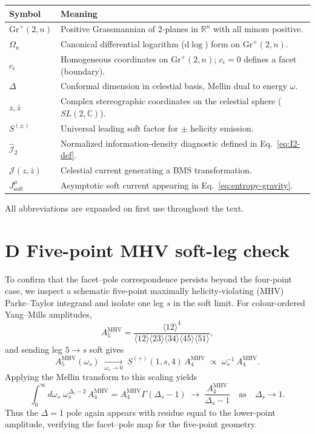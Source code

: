 \documentclass[11pt]{article}
\begin{document}
\begin{center}
\begin{tabular}{@{}ll@{}}
\toprule
Symbol & Meaning \\ \midrule
$\mathrm{Gr}^+(2,n)$ & Positive Grassmannian of 2-planes in $\mathbb{R}^n$ with all minors positive. \\
$\Omega_n$ & Canonical differential logarithm ($\mathrm{d}\!\log$) form on $\mathrm{Gr}^+(2,n)$. \\
$c_i$ & Homogeneous coordinates on $\mathrm{Gr}^+(2,n)$; $c_i=0$ defines a facet (boundary). \\
$\Delta$ & Conformal dimension in celestial basis, Mellin dual to energy $\omega$. \\
$z,\bar z$ & Complex stereographic coordinates on the celestial sphere ($SL(2,\mathbb{C})$). \\
$S^{(\pm)}$ & Universal leading soft factor for $\pm$ helicity emission. \\
$\widehat{\mathcal I}_2$ & Normalized information-density diagnostic defined in Eq.~\eqref{eq:I2-def}. \\
$\mathcal{J}(z,\bar z)$ & Celestial current generating a BMS transformation. \\
$J^\mu_{\text{soft}}$ & Asymptotic soft current appearing in Eq.~\eqref{eq:entropy-gravity}. \\ \bottomrule
\end{tabular}
\end{center}

All abbreviations are expanded on first use throughout the text.

\section*{D  Five-point MHV soft-leg check}

To confirm that the facet--pole correspondence persists beyond the four-point case,
we inspect a schematic five-point maximally helicity-violating (MHV) Parke--Taylor
integrand and isolate one leg $s$ in the soft limit.
For colour-ordered Yang--Mills amplitudes,
\[
A_5^{\mathrm{MHV}} = 
\frac{\langle12\rangle^4}
     {\langle12\rangle\langle23\rangle\langle34\rangle
      \langle45\rangle\langle51\rangle},
\]
and sending leg $5\!\to\!s$ soft gives
\[
A_5^{\mathrm{MHV}}(\omega_s)
   \;\xrightarrow[\omega_s\to0]{}\;
   S^{(+)}(1,s,4)\,A_4^{\mathrm{MHV}} 
   \;\propto\; \omega_s^{-1}\,A_4^{\mathrm{MHV}}.
\]
Applying the Mellin transform to this scaling yields
\[
\int_0^{\infty} \! d\omega_s\;
   \omega_s^{\Delta_s-2}\,A_4^{\mathrm{MHV}}
   = A_4^{\mathrm{MHV}}\Gamma(\Delta_s-1)
   \;\longrightarrow\;
   \frac{A_4^{\mathrm{MHV}}}{\Delta_s-1}
   \quad\text{as}\quad \Delta_s\to1.
\]
Thus the $\Delta=1$ pole again appears with residue equal to the lower-point
amplitude, verifying the facet--pole map for the five-point geometry.
\end{document}
